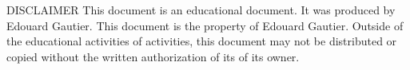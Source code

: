 \documentclass[a4paper,11pt,titlepage]{article}
\begin{document}

DISCLAIMER
This document is an educational document. It was produced by Edouard Gautier.
This document is the property of Edouard Gautier. Outside of the educational activities of
activities, this document may not be distributed or copied without the written authorization of its
of its owner.

 \label{TableOfVersion} %

\tableofcontents %







\printglossary[] \label{domaindictionary} %
\glsaddallunused %

\listoffigures \label{TableOfFigure} %

\listoflistings \label{TableOfCode} %

\printbibliography[heading=bibnumbered, label=bibliographie] %
\nocite{*} %

\label{Lastpage} %
\end{document}
